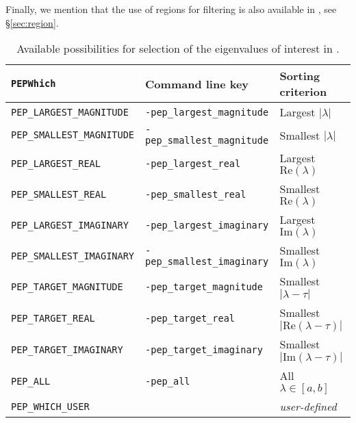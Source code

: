 Finally, we mention that the use of regions for filtering is also available in , see \S\ref{sec:region}.

\begin{table}
\centering
{\small \begin{tabular}{lll}
\texttt{PEPWhich}                  & Command line key                   & Sorting criterion \\\hline
\texttt{PEP\_LARGEST\_MAGNITUDE}   & \texttt{-pep\_largest\_magnitude}  & Largest $|\lambda|$ \\
\texttt{PEP\_SMALLEST\_MAGNITUDE}  & \texttt{-pep\_smallest\_magnitude} & Smallest $|\lambda|$ \\
\texttt{PEP\_LARGEST\_REAL}        & \texttt{-pep\_largest\_real}       & Largest $\mathrm{Re}(\lambda)$ \\
\texttt{PEP\_SMALLEST\_REAL}       & \texttt{-pep\_smallest\_real}      & Smallest $\mathrm{Re}(\lambda)$ \\
\texttt{PEP\_LARGEST\_IMAGINARY}   & \texttt{-pep\_largest\_imaginary}  & Largest $\mathrm{Im}(\lambda)$\footnotemark[1] \\
\texttt{PEP\_SMALLEST\_IMAGINARY}  & \texttt{-pep\_smallest\_imaginary} & Smallest $\mathrm{Im}(\lambda)$\footnotemark[1] \\\hline
\texttt{PEP\_TARGET\_MAGNITUDE}    & \texttt{-pep\_target\_magnitude}   & Smallest $|\lambda-\tau|$ \\
\texttt{PEP\_TARGET\_REAL}         & \texttt{-pep\_target\_real}        & Smallest $|\mathrm{Re}(\lambda-\tau)|$ \\
\texttt{PEP\_TARGET\_IMAGINARY}    & \texttt{-pep\_target\_imaginary}   & Smallest $|\mathrm{Im}(\lambda-\tau)|$ \\\hline
\texttt{PEP\_ALL}                  & \texttt{-pep\_all}                 & All $\lambda\in[a,b]$ \\
\texttt{PEP\_WHICH\_USER}          &                                    & \emph{user-defined} \\\hline
\end{tabular} }
\caption{\label{tab:portionq}Available possibilities for selection of the eigenvalues of interest in .}
\end{table}


